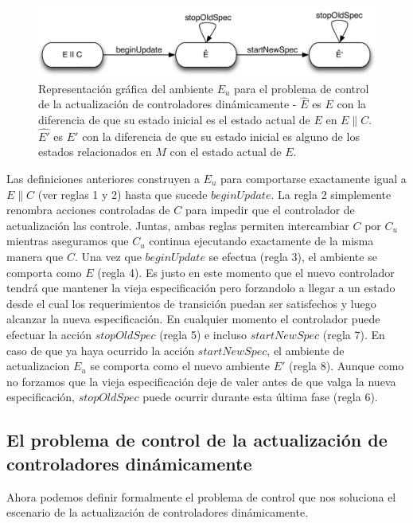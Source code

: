 \begin{figure}
\centering
\includegraphics[scale=0.35]{img/E_u.png}
\caption{Representación gráfica del ambiente $E_u$ para el problema de control de la actualización de controladores
dinámicamente - $\hat{E}$ es $E$ con la diferencia de que su estado inicial es el estado actual de $E$ en $E\|C$.
$\hat{E'}$ es $E'$ con la diferencia de que su estado inicial es alguno de los estados relacionados en $M$ con el estado
actual de $E$.}
\label{update_environment}
\end{figure}

Las definiciones anteriores construyen a $E_u$ para comportarse exactamente igual a $E\|C$ (ver reglas 1 y 2) hasta que
sucede $beginUpdate$. La regla 2 simplemente renombra acciones controladas de $C$ para impedir que el controlador de
actualización las controle. Juntas, ambas reglas permiten intercambiar $C$ por $C_u$ mientras aseguramos que $C_u$
continua ejecutando exactamente de la misma manera que $C$. Una vez que $beginUpdate$ se efectua (regla 3), el ambiente
se comporta como $E$ (regla 4). Es justo en este momento que el nuevo controlador tendrá que mantener la vieja
especificación pero forzandolo a llegar a un estado desde el cual los requerimientos de transición puedan ser
satisfechos y luego alcanzar la nueva especificación. En cualquier momento el controlador puede efectuar la acción
$stopOldSpec$ (regla 5) e incluso $startNewSpec$ (regla 7). En caso de que ya haya ocurrido la acción $startNewSpec$, el
ambiente de actualizacion $E_u$ se comporta como el nuevo ambiente $E'$ (regla 8). Aunque como no forzamos que la
vieja especificación deje de valer antes de que valga la nueva especificación, $stopOldSpec$ puede ocurrir durante esta
última fase (regla 6).

\subsection{El problema de control de la actualización de controladores dinámicamente}

Ahora podemos definir formalmente el problema de control que nos soluciona el escenario de la actualización de
controladores dinámicamente.

